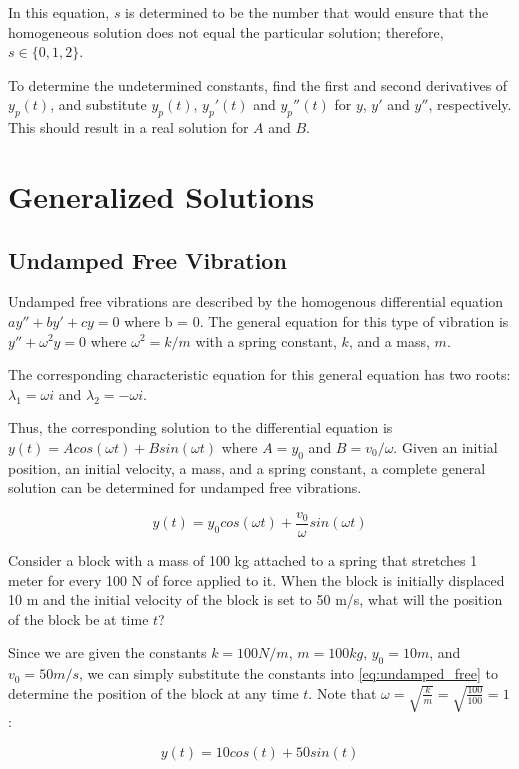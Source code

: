 \documentclass[11pt]{article} %
\begin{document}
\begin{multicols}{2}
In this equation, $s$ is determined to be the number that would ensure that the homogeneous solution does not equal the particular solution; therefore, $s \in \{0, 1, 2\}$.

To determine the undetermined constants, find  the first and second derivatives of $y_p(t)$, and substitute $y_p(t)$, $y_p'(t)$ and $y_p''(t)$ for $y$, $y'$ and $y''$, respectively. This should result in a real solution for $A$ and $B$.

\section {Generalized Solutions}
\subsection {Undamped Free Vibration}
Undamped free vibrations are described by the homogenous differential equation $ay'' + by' + cy = 0$ where b = 0. The general equation for this type of vibration is $y'' + \omega^2y = 0$ where $\omega^2 = k / m$ with a spring constant, $k$, and a mass, $m$.

The corresponding characteristic equation for this general equation has two roots: $\lambda_1 = {\omega}i$ and $\lambda_2 = -{\omega}i$.

Thus, the corresponding solution to the differential equation is $y(t) = Acos({\omega}t) + Bsin({\omega}t)$ where $A = y_0$ and $B = v_0 / \omega$. Given an initial position, an initial velocity, a mass, and a spring constant, a complete general solution can be determined for undamped free vibrations.

\begin{equation}\label{eq:undamped_free}
y(t) = {y_0}cos({\omega}t) +  \frac{v_0}{\omega}sin({\omega}t)
\end{equation}

Consider a block with a mass of 100 kg attached to a spring that stretches 1 meter for every 100 N of force applied to it. When the block is initially displaced 10 m and the initial velocity of the block is set to 50 m/s, what will the position of the block be at time $t$?

Since we are given the constants $k = 100 N/m$, $m = 100 kg$, $y_0 = 10 m$, and $v_0 = 50 m/s$, we can simply substitute the constants into \eqref{eq:undamped_free} to determine the position of the block at any time $t$. Note that $\omega = \sqrt{\frac{k}{m}} = \sqrt{\frac{100}{100}} = 1$:

\begin{equation}
y(t) = 10cos(t) + 50sin(t)
\end{equation}


\end{multicols}
\end{document}
